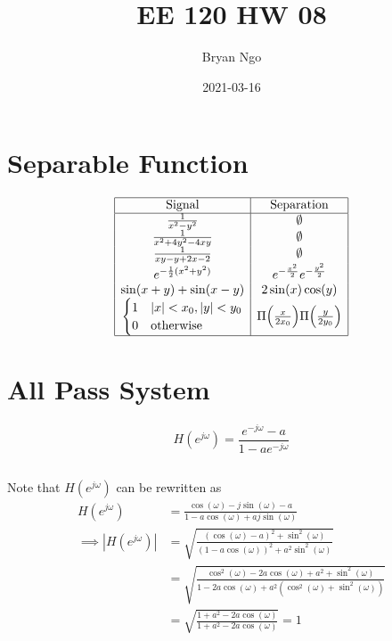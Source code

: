 \documentclass{article}
\title{EE 120 HW 08}
\author{Bryan Ngo}
\date{2021-03-16}
\begin{document}
\maketitle

\section{Separable Function}

\begin{equation}
    \begin{array}{|c|c|}
        \hline
        \text{Signal} & \text{Separation} \\
        \hline
        \frac{1}{x^2 - y^2} & \emptyset \\
        \frac{1}{x^2 + 4y^2 - 4xy} & \emptyset \\
        \frac{1}{xy - y + 2x - 2} & \emptyset \\
        e^{-\frac{1}{2} (x^2 + y^2)} & e^{-\frac{x^2}{2}} e^{-\frac{y^2}{2}} \\
        \sin(x + y) + \sin(x - y) & 2 \sin(x) \cos(y) \\
        \begin{cases}
            1 & |x| < x_0, |y| < y_0 \\
            0 & \text{otherwise}
        \end{cases} & \Pi\qty(\frac{x}{2x_0}) \Pi\qty(\frac{y}{2y_0}) \\
        \hline
    \end{array}
\end{equation}

\section{All Pass System}

\begin{equation}
    H(e^{j \omega}) = \frac{e^{-j \omega} - a}{1 - ae^{-j \omega}}
\end{equation}

\subsection{}

Note that \(H(e^{j \omega})\) can be rewritten as
\begin{align}
    H(e^{j \omega}) &= \frac{\cos(\omega) - j \sin(\omega) - a}{1 - a \cos(\omega) + a j \sin(\omega)} \\
    \implies |H(e^{j \omega})| &= \sqrt{\frac{(\cos(\omega) - a)^2 + \sin^2(\omega)}{(1 - a \cos(\omega))^2 + a^2 \sin^2(\omega)}} \\
    &= \sqrt{\frac{\cos^2(\omega) - 2a \cos(\omega) + a^2 + \sin^2(\omega)}{1 - 2a \cos(\omega) + a^2 (\cos^2(\omega) + \sin^2(\omega))}} \\
    &= \sqrt{\frac{1 + a^2 - 2a \cos(\omega)}{1 + a^2 - 2a \cos(\omega)}} = 1
\end{align}
\end{document}
